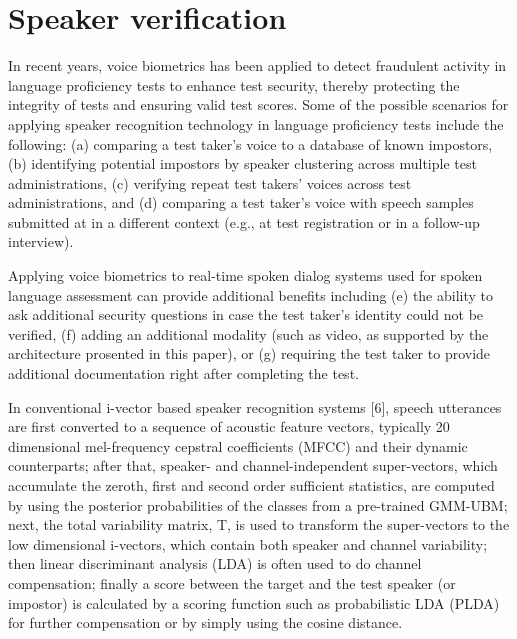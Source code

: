 \documentclass{article} %
\begin{document}

\section{Speaker verification}
In recent years, voice biometrics has been applied to detect fraudulent activity in language proficiency tests to enhance test security, thereby protecting the integrity of tests and ensuring valid test scores. Some of the possible scenarios for applying speaker recognition technology in language proficiency tests include the following: (a) comparing a test taker’s voice to a database of known impostors, (b) identifying potential impostors by speaker clustering across multiple test administrations, (c) verifying repeat test takers’ voices across test administrations, and (d) comparing a test taker’s voice with speech samples submitted at in a different context (e.g., at test registration or in a follow-up interview).

Applying voice biometrics to real-time spoken dialog systems used for spoken language assessment can provide additional benefits including (e) the ability to ask additional security questions in case the test taker's identity could not be verified, (f) adding an additional modality (such as video, as supported by the architecture prosented in this paper), or (g) requiring the test taker to provide additional documentation right after completing the test.

In conventional i-vector based speaker recognition systems [6],  speech utterances are first converted to a sequence of acoustic feature vectors, typically 20 dimensional mel-frequency cepstral coefficients (MFCC) and their dynamic counterparts; after that, speaker- and channel-independent super-vectors, which accumulate the zeroth, first and second order sufficient statistics, are computed by using the posterior probabilities of the classes from a pre-trained GMM-UBM;  next, the total variability matrix, T, is used to transform the super-vectors to the low dimensional i-vectors, which contain both speaker and channel variability; then linear discriminant analysis (LDA) is often used to do channel compensation; finally a score between the target and the test speaker (or impostor) is calculated by a scoring function such as probabilistic LDA (PLDA) for further compensation or by simply using the cosine distance. 
\end{document}
